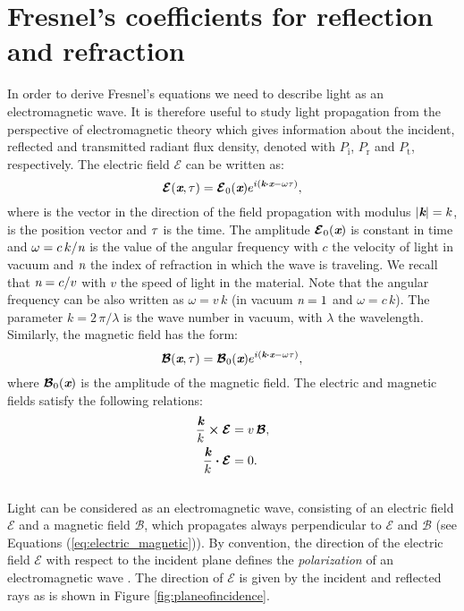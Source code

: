 \section{Fresnel's coefficients for reflection and refraction}\label{sec:fresnel}
In order to derive Fresnel's equations we need to describe light as an electromagnetic wave. 
It is therefore useful to study light propagation from the perspective of electromagnetic theory which gives information about the incident, reflected and transmitted radiant flux density, denoted with $P_\textrm{i}$, $P_\textrm{r}$ and $P_\textrm{t}$, respectively.  
The electric field $\boldsymbol{\mathcal{E}}$ can be written as: 
\begin{equation}
\boldsymbol{\mathcal{E}}(\textit{\textbf{x}}, \tau) = \boldsymbol{\mathcal{E}}_0(\textit{\textbf{x}} )e^{i( \textit{\textbf{k}}\boldsymbol{\cdot}\textit{\textbf{x}}-\omega \tau)},
\end{equation}
where  is the vector in the direction of the field propagation with modulus 
$|\textit{\textbf{k}}| = k$,  is the position vector and $\tau$ is the time. The amplitude $\boldsymbol{\mathcal{E}}_0(\textit{\textbf{x}})$ is constant in time and $\omega = c\,k/ \textit{n}$ is the value of the angular frequency with $c$ the velocity of light in vacuum and $\textit{n}$ the index of refraction in which the wave is traveling. We recall that $\textit{n} = c/v$ with $v$ the speed of light in the material. Note that the angular frequency can be also written as $\omega = v\,k$ (in vacuum $\textit{n}=1$ and $\omega=c\,k$). The parameter
$k =2\,\pi/\lambda$ is the wave number in vacuum, with $\lambda$ the wavelength. \\ \indent Similarly, the magnetic field has the form:
\begin{equation}
\boldsymbol{\mathcal{B}}(\textit{\textbf{x}}, \tau) = \boldsymbol{\mathcal{B}}_0(\textit{\textbf{x}}) e^{i( \textit{\textbf{k}}\boldsymbol{\cdot} \textit{\textbf{x}}-\omega \tau )},
\end{equation}
where $\boldsymbol{\mathcal{B}}_0(\textit{\textbf{x}})$ is the amplitude of the magnetic field.
The electric and magnetic fields satisfy the following relations:
\begin{subequations}\label{eq:electric_magnetic}
\begin{align}
\frac{\textit{\textbf{k}}}{k} \boldsymbol{\times} \boldsymbol{\mathcal{E}} & = v \, \boldsymbol{\mathcal{B}}, \\
\frac{\textit{\textbf{k}}}{k} \boldsymbol{\cdot}\boldsymbol{\mathcal{E}} &=0.
\end{align}
\end{subequations}
\\ \indent Light can be considered as an electromagnetic wave, consisting of an electric field $\boldsymbol{\mathcal{E}}$ and a magnetic field $\boldsymbol{\mathcal{B}}$, which propagates always perpendicular to $\boldsymbol{\mathcal{E}}$ and $\boldsymbol{\mathcal{B}}$ (see Equations (\ref{eq:electric_magnetic})). By convention, the direction of the electric field $\boldsymbol{\mathcal{E}}$ with respect to the incident plane defines the \textit{polarization} of an electromagnetic wave \cite{feynman1964feynman}. The direction of $\boldsymbol{\mathcal{E}}$ is given by the incident and reflected rays as is shown in Figure \ref{fig:planeofincidence}. \\
